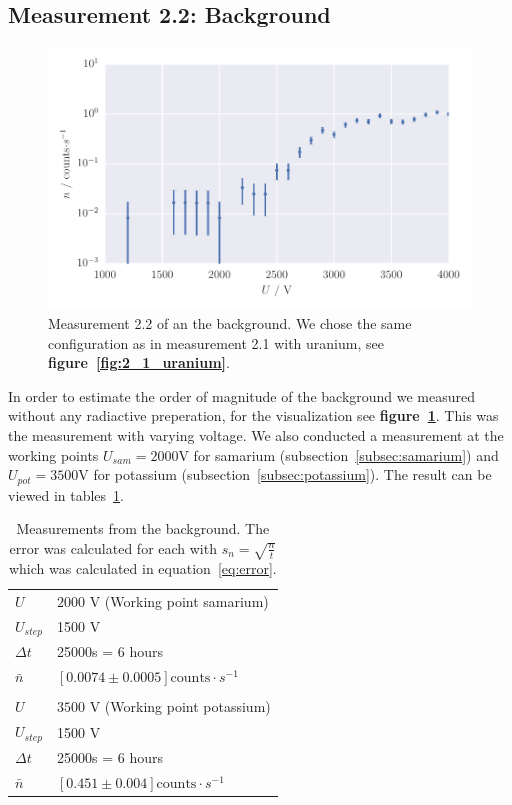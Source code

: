 \subsection{Measurement 2.2: Background}
\label{subsec:background}
\begin{figure}[H]
    \centering
    \includegraphics[width=\linewidth]{analysis/figures/2_2_background2}
    \caption{Measurement 2.2 of an the background. We chose the same configuration as in measurement 2.1 with uranium, see
    \textbf{figure~\ref{fig:2_1_uranium}}.}
    \label{fig:2_2_background2}
\end{figure}

In order to estimate the order of magnitude of the background we measured without any radiactive preperation, for 
the visualization see \textbf{figure~\ref{fig:2_2_background2}}. This was the measurement with varying voltage.
We also conducted a measurement at the working points $U_{sam} = 2000$V for samarium (subsection~\ref{subsec:samarium}) and
$U_{pot} = 3500$V for potassium (subsection~\ref{subsec:potassium}). The result can be viewed in tables~\ref{tab:background_night1}.
\begin{table}

\centering
\begin{tabular}{ll}
 \rowcolor{tabcolor}$U$ & $2000$ V (Working point samarium)\\
 $U_{step}$ & 1500 V \\
 \rowcolor{tabcolor}$\Delta t$ & 25000s = 6 hours \\
 $\bar{n}$ & $\left [ 0.0074 \pm 0.0005 \right ] \text{counts} \cdot s^{-1}$ \\
  \\
 \rowcolor{tabcolor}$U$ & $3500$ V (Working point potassium)\\
 $U_{step}$ & 1500 V \\
 \rowcolor{tabcolor}$\Delta t$ & 25000s = 6 hours \\
 $\bar{n}$ & $\left [ 0.451 \pm 0.004 \right ] \text{counts} \cdot s^{-1}$ \\
 \end{tabular}

\caption{Measurements from the background. The error was calculated for each with
$s_n = \sqrt{\frac{n}{t}}$ which was calculated in equation~\ref{eq:error}.
}
\label{tab:background_night1}

\end{table}
